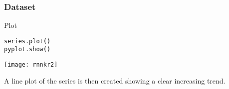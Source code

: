 \begin{frame}[fragile] \frametitle{Dataset}
Plot 
\begin{lstlisting}
series.plot()
pyplot.show()
\end{lstlisting}   
\begin{center}
\texttt{[image: rnnkr2]}
\end{center}
A line plot of the series is then created showing a clear increasing trend.
\end{frame}

